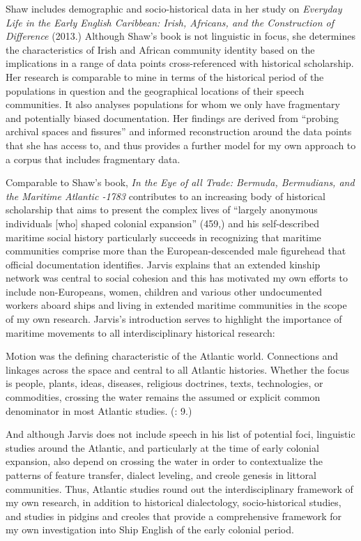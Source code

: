 Shaw includes demographic and socio-historical data in her study on \textit{Everyday Life in the Early English Caribbean: Irish, Africans, and the Construction of Difference} (2013.) Although Shaw’s book is not linguistic in focus, she determines the characteristics of Irish and African community identity based on the implications in a range of data points cross-referenced with historical scholarship. Her research is comparable to mine in terms of the historical period of the populations in question and the geographical locations of their speech communities. It also analyses populations for whom we only have fragmentary and potentially biased documentation. Her findings are derived from “probing archival spaces and fissures”  and informed reconstruction around the data points that she has access to, and thus provides a further model for my own approach to a corpus that includes fragmentary data. 

Comparable to Shaw’s book,  \textit{In the Eye of all Trade: Bermuda, Bermudians, and the Maritime Atlantic \citealt{World1680}-1783} contributes to an increasing body of historical scholarship that aims to present the complex lives of “largely anonymous individuals [who] shaped colonial expansion” (459,) and his self-described maritime social history particularly succeeds in recognizing that maritime communities comprise more than the European-descended male figurehead that official documentation identifies. Jarvis explains that an extended kinship network was central to social cohesion and this has motivated my own efforts to include non-Europeans, women, children and various other undocumented workers aboard ships and living in extended maritime communities in the scope of my own research. Jarvis’s introduction serves to highlight the importance of maritime movements to all interdisciplinary historical research: 

Motion was the defining characteristic of the Atlantic world. Connections and linkages across the space and central to all Atlantic histories. Whether the focus is people, plants, ideas, diseases, religious doctrines, texts, technologies, or commodities, crossing the water remains the assumed or explicit common denominator in most Atlantic studies. (\citealt{Jarvis2010}: 9.)

And although Jarvis does not include speech in his list of potential foci, linguistic studies around the Atlantic, and particularly at the time of early colonial expansion, also depend on crossing the water in order to contextualize the patterns of feature transfer, dialect leveling, and creole genesis in littoral communities. Thus, Atlantic studies round out the interdisciplinary framework of my own research, in addition to historical dialectology, socio-historical studies, and studies in pidgins and creoles that provide a comprehensive framework for my own investigation into Ship English of the early colonial period. 

